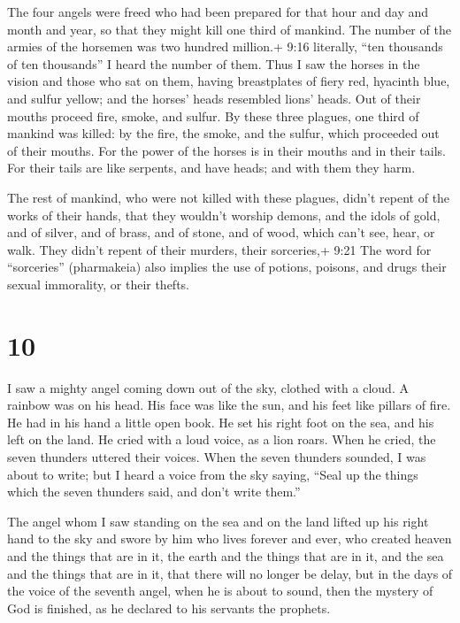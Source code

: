  The four angels were freed who had been prepared for that
hour and day and month and year, so that they might kill one third of
mankind.  The number of the armies of the horsemen was two
hundred million.+ 9:16 literally, ``ten thousands of ten thousands'' I
heard the number of them.  Thus I saw the horses in the
vision and those who sat on them, having breastplates of fiery red,
hyacinth blue, and sulfur yellow; and the horses' heads resembled lions'
heads. Out of their mouths proceed fire, smoke, and sulfur.
 By these three plagues, one third of mankind was killed:
by the fire, the smoke, and the sulfur, which proceeded out of their
mouths.  For the power of the horses is in their mouths and
in their tails. For their tails are like serpents, and have heads; and
with them they harm.

 The rest of mankind, who were not killed with these
plagues, didn't repent of the works of their hands, that they wouldn't
worship demons, and the idols of gold, and of silver, and of brass, and
of stone, and of wood, which can't see, hear, or walk. 
They didn't repent of their murders, their sorceries,+ 9:21 The word for
``sorceries'' (pharmakeia) also implies the use of potions, poisons, and
drugs their sexual immorality, or their thefts.

\hypertarget{section-9}{%
\section{10}\label{section-9}}

 I saw a mighty angel coming down out of the sky, clothed
with a cloud. A rainbow was on his head. His face was like the sun, and
his feet like pillars of fire.  He had in his hand a little
open book. He set his right foot on the sea, and his left on the land.
 He cried with a loud voice, as a lion roars. When he cried,
the seven thunders uttered their voices.  When the seven
thunders sounded, I was about to write; but I heard a voice from the sky
saying, ``Seal up the things which the seven thunders said, and don't
write them.''

 The angel whom I saw standing on the sea and on the land
lifted up his right hand to the sky  and swore by him who
lives forever and ever, who created heaven and the things that are in
it, the earth and the things that are in it, and the sea and the things
that are in it, that there will no longer be delay,  but in
the days of the voice of the seventh angel, when he is about to sound,
then the mystery of God is finished, as he declared to his servants the
prophets.

